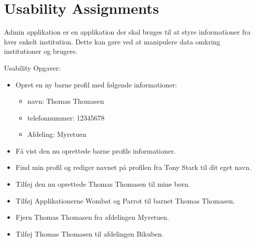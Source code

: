 \section{Usability Assignments}
\label{sec:usabilityAss}
Admin applikation er en applikation der skal bruges til at styre informationer fra hver enkelt institution. Dette kan g\o{}re ved at manipulere data omkring institutioner og brugere.

Usability Opgaver:
\begin{itemize}
\item Opret en ny barne profil med f\o{}lgende informationer:
\begin{itemize}
		\item navn: 			Thomas Thomasen
	\item telefonnummer: 	12345678
		\item Afdeling:		Myretuen
		\end{itemize}
\item F\aa{} vist den nu oprettede barne profils informationer.
\item Find min profil og rediger navnet p\aa{} profilen fra Tony Stark til dit eget navn.
\item Tilf\o{}j den nu oprettede Thomas Thomasen til mine b\o{}rn.
\item Tilf\o{}j Applikationerne Wombat og Parrot til barnet Thomas Thomasen.
\item Fjern Thomas Thomasen fra afdelingen Myretuen.
\item Tilf\o{}j Thomas Thomasen til afdelingen Bikuben.
\end{itemize}